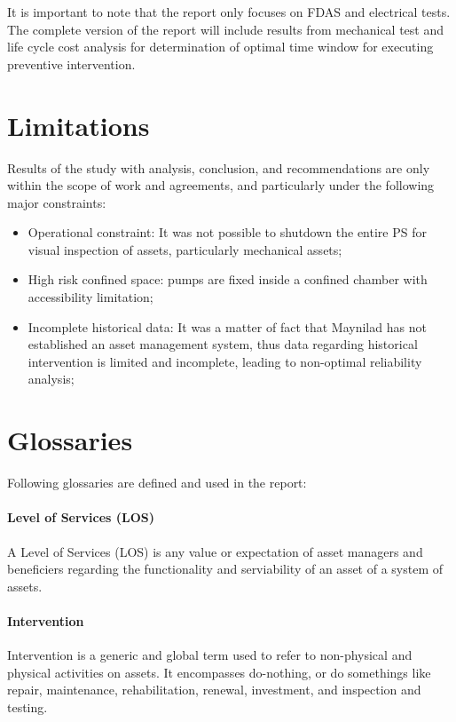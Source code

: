 {\color{red}
It is important to note that the report only focuses on FDAS and electrical tests. The complete version of the report will include results from mechanical test and life cycle cost analysis for determination of optimal time window for executing preventive intervention. 
}


\section{Limitations}
Results of the study with analysis, conclusion, and recommendations are only within the scope of work and agreements, and particularly under the following major constraints:
\begin{itemize}
\item Operational constraint: It was not possible to shutdown the entire PS for visual inspection of assets, particularly mechanical assets;

\item High risk confined space: pumps are fixed inside a confined chamber with accessibility limitation;


\item Incomplete historical data: It was a matter of fact that Maynilad has not established an asset management system, thus data regarding historical intervention is limited and incomplete, leading to non-optimal reliability analysis; 
\end{itemize}



\section{Glossaries}
Following glossaries are defined and used in the report:

\paragraph{\textbf{Level of Services (LOS)}}
A Level of Services (LOS) is any value or expectation of asset managers and beneficiers regarding the functionality and serviability of an asset of a system of assets.

\paragraph{\textbf{Intervention}}
Intervention is a generic and global term used to refer to non-physical and physical activities on assets. It encompasses do-nothing, or do somethings like repair, maintenance, rehabilitation, renewal, investment, and inspection and testing.

